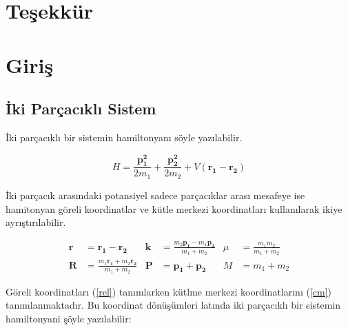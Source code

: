 \documentclass[12pt, a4paper]{article}
\newcommand{\vect}[1]{\mathbf{#1}}
\begin{document}
\tableofcontents
\thispagestyle{empty}



\newpage
\setcounter{page}{1}
\begin{abstract}


\end{abstract}
\newpage
{}
\section*{\centering Teşekkür}
\newpage
{}
\setcounter{page}{1}

\section{Giriş}
\subsection{İki Parçacıklı Sistem}

İki parçacıklı bir sistemin hamiltonyanı söyle yazılabilir.

\begin{equation} \label{h}
H = \frac{\vect{p_1^2}}{2m_1}+\frac{\vect{p_2^2}}{2m_2}+V(\vect{r_1}-\vect{r_2})
\end{equation}

İki parçacık arasındaki potansiyel sadece parçacıklar arası mesafeye ise hamitonyan göreli koordinatlar ve kütle merkezi koordinatları kullanılarak ikiye ayrıştırılabilir.

\begin{align}
\label{rel}
\vect{r}&=\vect{r_1}-\vect{r_2} &\vect{k}&=\frac{m_2\vect{p_1}-m_1\vect{p_2}}{m_1+m_2} & \mu&=\frac{m_1m_2}{m_1+m_2}\\
\label{cm}
\vect{R}&=\frac{m_1\vect{r_1}+m_2\vect{r_2}}{m_1+m_2}&\vect{P}&=\vect{p_1}+\vect{p_2}&M&=m_1+m_2
\end{align}
 
Göreli koordinatları (\ref{rel}) tanımlarken kütlme merkezi koordinatlarını (\ref{cm}) tanımlanmaktadır. Bu koordinat dönüşümleri latında iki parçacıklı bir sistemin hamiltonyani şöyle yazılabilir:
\end{document}
